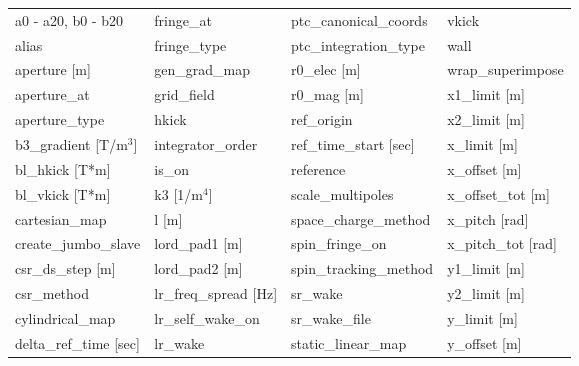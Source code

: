  \begin{tabular}{llll} \toprule
a0 - a20, b0 - b20               & fringe_at                        & ptc_canonical_coords             & vkick                            \\
alias                            & fringe_type                      & ptc_integration_type             & wall                             \\
aperture [m]                     & gen_grad_map                     & r0_elec [m]                      & wrap_superimpose                 \\
aperture_at                      & grid_field                       & r0_mag [m]                       & x1_limit [m]                     \\
aperture_type                    & hkick                            & ref_origin                       & x2_limit [m]                     \\
b3_gradient [T/m$^3$]            & integrator_order                 & ref_time_start [sec]             & x_limit [m]                      \\
bl_hkick [T*m]                   & is_on                            & reference                        & x_offset [m]                     \\
bl_vkick [T*m]                   & k3 [1/m$^4$]                     & scale_multipoles                 & x_offset_tot [m]                 \\
cartesian_map                    & l [m]                            & space_charge_method              & x_pitch [rad]                    \\
create_jumbo_slave               & lord_pad1 [m]                    & spin_fringe_on                   & x_pitch_tot [rad]                \\
csr_ds_step [m]                  & lord_pad2 [m]                    & spin_tracking_method             & y1_limit [m]                     \\
csr_method                       & lr_freq_spread [Hz]              & sr_wake                          & y2_limit [m]                     \\
cylindrical_map                  & lr_self_wake_on                  & sr_wake_file                     & y_limit [m]                      \\
delta_ref_time [sec]             & lr_wake                          & static_linear_map                & y_offset [m]                     \\

\end{tabular}
